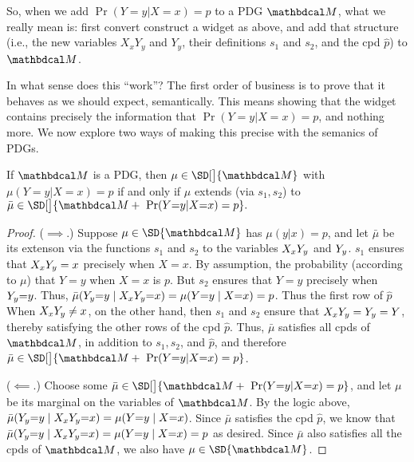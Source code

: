 So, when we add $\Pr(Y=y|X=x) = p$ to a PDG $\dg M$, what we really mean is:
first convert construct a widget as above, and add that structure (i.e., the new variables
$X_xY_y$ and $Y_y$, their definitions $s_1$ and $s_2$, and the cpd $\hat p$) to $\dg M$.

In what sense does this ``work''?
The first order of business
is to prove that it behaves as we should expect,
semantically.
This means showing that the widget contains precisely the information
    that $\Pr(Y{=}y|X{=}x) = p$, and nothing more. 
We now explore two ways of making this precise with the semanics of PDGs.

\begin{prop}
        \label{prop:individual-prob-1}
    If $\dg M$ is a PDG, then 
    $
    \mu \in \SD[\big]{\dg M} 
    $ with $
    \mu(Y{=}y|X{=}x) = p
    $
    if and only if
    $
    \mu 
    $ extends (via $s_1,s_2$) to $
    \bar\mu \in \SD[\big]{\dg M + ~\Pr(Y{=}y|X{=}x) = p}.
    $
\end{prop}
\begin{proof}
    ($\implies$.)
    Suppose $\mu \in \SD{\dg M}$ has $\mu(y|x) = p$, and let $\bar\mu$ be its extenson via the functions $s_1$ and $s_2$ to the variables ${X_x Y_y}$ and ${Y_y}$. 
    $s_1$ ensures that ${X_x Y_y} = x$ precisely when $X = x$. 
    By assumption, the probability (according to $\mu$) that $Y{=}y$
    when $X{=}x$ is $p$. But $s_2$ ensures that $Y{=}y$ precisely when ${Y_y}{=}y$. 
    Thus,
    $\bar\mu({Y_y} {=} y \mid {X_x Y_y} {=} x) = \mu(Y{=}y \mid X{=}x) = p$.
    Thus the first row of $\hat p$
    When ${X_x Y_y} \ne x$, on the other hand, then $s_1$ and $s_2$ ensure
    that ${X_x Y_y} = {Y_y} = Y$, thereby satisfying the other rows 
    of the cpd $\hat p$. 
    Thus, $\bar \mu$ satisfies all cpds of $\dg M$, in addition to $s_1, s_2$, and $\hat p$, and therefore $\bar\mu \in \SD[\big]{\dg M + ~\Pr(Y{=}y|X{=}x) = p}$.
    
    ($\impliedby$.)
    Choose some $\bar\mu \in \SD[\big]{\dg M + ~\Pr(Y{=}y|X{=}x) = p}$,
    and let $\mu$ be its marginal on the variables of $\dg M$. 
    By the logic above, $\bar\mu({Y_y} {=} y \mid {X_x Y_y} {=} x) = \mu(Y{=}y \mid X{=}x)$.
    Since $\bar\mu$ satisfies the cpd $\hat p$, we know that $\bar\mu({Y_y} {=} y \mid {X_x Y_y} {=} x) = \mu(Y{=}y \mid X{=}x) = p$ as desired.
    Since $\bar\mu$ also satisfies all the cpds of $\dg M$, we also have $\mu \in \SD{\dg M}$.
\end{proof}

